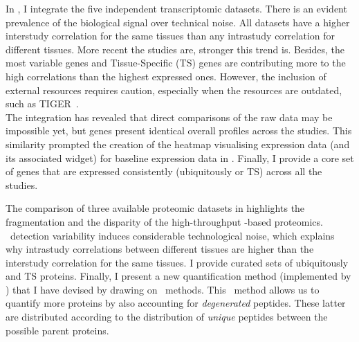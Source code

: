 In ,
I integrate the five independent transcriptomic datasets.
There is an evident prevalence of the biological signal over technical noise.
All datasets have a higher interstudy correlation for the same tissues
than any intrastudy correlation for different tissues.
More recent the studies are, stronger this trend is.
Besides,
the most variable genes and Tissue-Specific (\gls{TS}) genes are contributing
more to the high correlations than the highest expressed ones.
However, the inclusion of external resources requires caution,
especially when the resources are outdated, such as \gls{TIGER}~.\\
The integration has revealed that
direct comparisons of the raw data may be impossible yet,
but genes present identical overall profiles across the studies.
This similarity prompted the creation of the heatmap visualising expression data
(and its associated widget) for baseline expression data in
.
Finally, I provide a core set of genes that are expressed consistently
(ubiquitously or \gls{TS}) across all the studies.

The comparison of three available proteomic datasets
in  highlights
the fragmentation and the disparity of the high-throughput \ms{}-based proteomics.
\ms\ detection variability induces considerable technological noise,
which explains
why intrastudy correlations between different tissues are
higher than the interstudy correlation for the same tissues.
I provide curated sets of ubiquitously and \gls{TS} proteins.
Finally, I present a new quantification method (implemented by \james) that
I have devised by drawing on \Rnaseq\ methods.
This \PPKM\ method allows us to quantify more proteins
by also accounting for \emph{degenerated} peptides.
These latter are distributed according to the distribution of \emph{unique} peptides
between the possible parent proteins.

